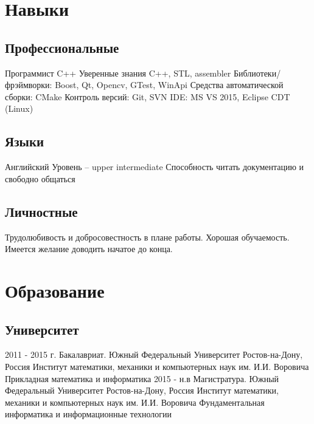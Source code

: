 \documentclass[11pt,a4paper]{moderncv}
\begin{document}
\maketitle

\section{Навыки}
  \subsection{Профессиональные}
    \cvline
    {Программист C++}
      {
      Уверенные знания C++, STL, assembler\newline{}
      Библиотеки/фрэймворки: Boost, Qt, Opencv, GTest, WinApi \newline{}
      Средства автоматической сборки: CMake \newline{}
      Контроль версий: Git, SVN \newline{}
      IDE: MS VS 2015, Eclipse CDT (Linux)
      }
  \subsection{Языки}
    \cvline
    {Английский}
      {
      Уровень -- upper intermediate \newline{}
      Способность читать документацию и свободно общаться
      }
  \subsection{Личностные}
    \cvline{}
    { Трудолюбивость и добросовестность в плане работы. Хорошая обучаемость. Имеется желание доводить начатое до конца.
     }

\section{Образование}
  \subsection{Университет}
    \cventry
      {2011 - 2015 г.}
      {Бакалавриат. Южный Федеральный Университет}
      {Ростов-на-Дону, Россия}
      {Институт математики, механики и компьютерных наук им. И.И. Воровича}
      {Прикладная математика и информатика}
      {}
    \cventry
      {2015 - н.в}
      {Магистратура. Южный Федеральный Университет}
      {Ростов-на-Дону, Россия}
      {Институт математики, механики и компьютерных наук им. И.И. Воровича}
      {Фундаментальная информатика и информационные технологии}
      {}
\end{document}
